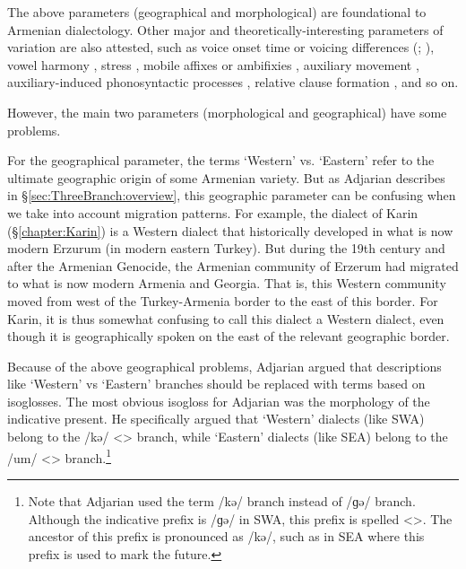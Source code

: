 The above parameters (geographical and morphological) are foundational to Armenian dialectology. Other       major and theoretically-interesting parameters of variation are also attested, such as voice onset time or voicing differences (\citealt[\S1.1.1]{Vaux-1998-ArmenianPhono}; \citealt{Baronian-2017-TwoProblemsArmenianPhono}), vowel harmony \citep{Vaux-1998-ArmenianPhono}, stress \citep{DeLisi-2018-ArmenianProsodyDiachrony}, mobile affixes or ambifixies \citep{BezrukovDolatian-2020-PLCArmenianMobile,Bezrukov-2022-DissCaucasusMotionArmenian}, auxiliary movement \citep{Comrie-1984-SomeFormalPropertiesFOcusEasternArmenian,KahnemuyipourMegerdoomian-2011-secondcliticvP,KahnemuyipourMegerdoomian-2017-positionalDistriutionFocus}, auxiliary-induced phonosyntactic processes \citep[\S3.3]{DolatianEtAl-prep-IranianGrammar}, relative clause formation \citep{Hodgson-2019-DissRelativeClauseArmenianSyntax}, and so on.

However, the main two parameters (morphological and geographical) have some problems. 

For the geographical parameter, the terms `Western' vs. `Eastern' refer to the ultimate geographic origin of some Armenian variety. But as Adjarian describes in \S\ref{sec:ThreeBranch:overview}, this geographic parameter can be confusing when we take into account migration patterns. For example, the dialect of Karin (\S\ref{chapter:Karin}) is a Western dialect that historically developed in what is now modern Erzurum (in modern eastern Turkey). But during the 19th century and after the Armenian Genocide, the Armenian community of Erzerum had migrated to what is now modern Armenia and Georgia. That is, this Western community moved from west of the Turkey-Armenia border to the east of this border. For Karin, it is thus somewhat confusing to call this dialect a Western dialect, even though it is geographically spoken on the east of the relevant geographic border. 

Because of the above geographical problems, Adjarian argued that descriptions like `Western' vs `Eastern' branches should be replaced with terms based on isoglosses. The most obvious isogloss for Adjarian was the morphology of the indicative present. He specifically argued that `Western' dialects (like SWA) belong to the /kə/ <> branch, while `Eastern' dialects (like SEA) belong to the /um/ <> branch.\footnote{Note that Adjarian used the term /kə/ branch instead of /ɡə/ branch. Although the indicative prefix is /ɡə/ in SWA, this prefix is spelled <>. The ancestor of this prefix is pronounced as /kə/, such as in SEA where this prefix is used to mark the  future.}

